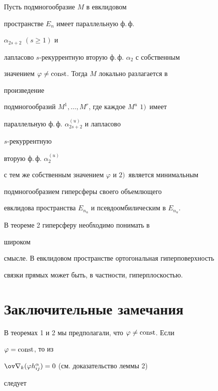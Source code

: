 \begin{thm} Пусть подмногообразие $M$ в евклидовом


пространстве $E_n$ имеет параллельную ф.\,ф.


$\alpha_{2s+2}$ $(s\ge 1)$ и


лапласово $s$-рекуррентную вторую ф.\,ф. $\alpha_2$ с собственным


значением $\varphi\ne\operatorname{const}$. Тогда $M$ локально разлагается в


произведение


подмногообразий $M^1,\dotsc,M^r$, где каждое $M^u$ $1)$~имеет


параллельную ф.\,ф. $\alpha^{(u)}_{2s+2}$ и лапласово


$s$-рекуррентную


вторую ф.\,ф. $\alpha^{(u)}_2$


с тем же собственным значением $\varphi$ и $2)$~является минимальным


подмногообразием гиперсферы своего объемлющего


евклидова пространства $E_{n_u}$ и псевдоомбилическим в $E_{n_u}$.


\end{thm}





\begin{notenonum} В теореме 2 гиперсферу необходимо понимать в


широком


смысле. В евклидовом пространстве ортогональная гиперповерхность


связки прямых может быть, в частности, гиперплоскостью.


\end{notenonum}





\section{Заключительные замечания}





В теоремах 1 и 2 мы предполагали, что $\varphi\ne\operatorname{const}$. Если


$\varphi=\operatorname{const}$, то из


$\ov\nabla_k(\varphi h^\alpha_{ij})=0$ (см. доказательство леммы 2)


следует


